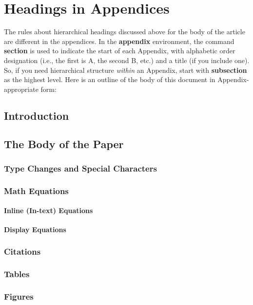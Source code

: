 


\appendix
\section{Headings in Appendices}
The rules about hierarchical headings discussed above for
the body of the article are different in the appendices.
In the \textbf{appendix} environment, the command
\textbf{section} is used to
indicate the start of each Appendix, with alphabetic order
designation (i.e., the first is A, the second B, etc.) and
a title (if you include one).  So, if you need
hierarchical structure
\textit{within} an Appendix, start with \textbf{subsection} as the
highest level. Here is an outline of the body of this
document in Appendix-appropriate form:
\subsection{Introduction}
\subsection{The Body of the Paper}
\subsubsection{Type Changes and  Special Characters}
\subsubsection{Math Equations}
\paragraph{Inline (In-text) Equations}
\paragraph{Display Equations}
\subsubsection{Citations}
\subsubsection{Tables}
\subsubsection{Figures}

